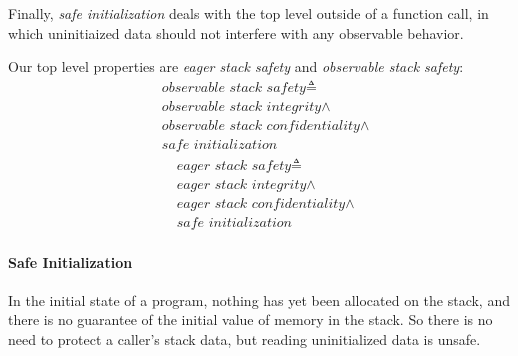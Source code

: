 \documentclass[conference]{IEEEtran}
\begin{document}
    Finally, {\it safe initialization} deals with the top level outside of a function call, in
    which uninitiaized data should not interfere with any observable behavior.


    Our top level properties are {\it eager stack safety} and {\it observable stack safety}:
    \[\begin{split}
      & \textit{observable stack safety} \triangleq \\
      & \textit{observable stack integrity} \land \\
      & \textit{observable stack confidentiality} \land \\
      & \textit{safe initialization}
    \end{split}\]
    \[\begin{split}
      & \textit{eager stack safety} \triangleq \\
      & \textit{eager stack integrity} \land \\
      & \textit{eager stack confidentiality} \land \\
      & \textit{safe initialization}
    \end{split}\]


    \paragraph{Safe Initialization}

    
      In the initial state of a program, nothing has yet been allocated on the stack, and
      there is no guarantee of the initial value of memory in the stack. So there is no
      need to protect a caller's stack data, but reading uninitialized data is unsafe.
\end{document}
